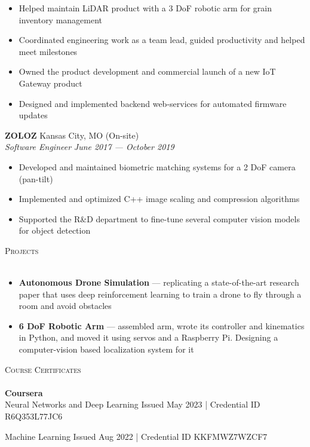 \documentclass[a4paper]{article}
\newcommand{\lineunder} {
    \vspace*{-8pt} \\
    \hspace*{-18pt} \hrulefill \\
}
\newcommand{\header} [1] {
    {\hspace*{-18pt}\vspace*{6pt} \textsc{#1}}
    \vspace*{-6pt} \lineunder
}
\begin{document}
\begin{itemize} \itemsep 1pt
	\item Helped maintain LiDAR product with a 3 DoF robotic arm for grain inventory management
	\item Coordinated engineering work as a team lead, guided productivity and helped meet milestones
	\item Owned the product development and commercial launch of a new IoT Gateway product
	\item Designed and implemented backend web-services for automated firmware updates
\end{itemize}
\textbf{ZOLOZ} \hfill Kansas City, MO (On-site)\\
\textit{Software Engineer} \hfill \textit{June 2017 --- October 2019}\\
\vspace{-1mm}
\begin{itemize} \itemsep 1pt
	\item Developed and maintained biometric matching systems for a 2 DoF camera (pan-tilt)
	\item Implemented and optimized C++ image scaling and compression algorithms
	\item Supported the R\&D department to fine-tune several computer vision models for object detection
\end{itemize}

\header{Projects}
\vspace{-1mm}
\begin{itemize} \itemsep 1pt
    \item \textbf{Autonomous Drone Simulation} --- replicating a state-of-the-art research paper that uses deep reinforcement
    learning to train a drone to fly through a room and avoid obstacles
    \item \textbf{6 DoF Robotic Arm} --- assembled arm, wrote its controller and kinematics in Python, and moved it using servos and a Raspberry Pi. Designing a computer-vision based localization system for it
\end{itemize}

\header{Course Certificates}
{\textbf{Coursera}}\\
\vspace{1.75mm}
Neural Networks and Deep Learning \hfill Issued May 2023 | \footnotesize{Credential ID R6Q353L77JC6}

\normalsize{}

\vspace{1mm}
Machine Learning \hfill Issued Aug 2022 | \footnotesize{Credential ID KKFMWZ7WZCF7}
\end{document}
